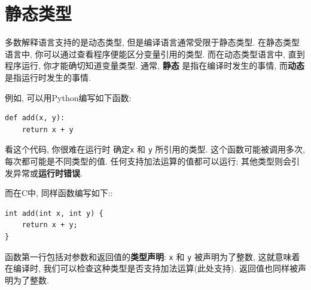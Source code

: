 \documentclass[12pt]{book}
\begin{document}
{%
\section{静态类型}
多数解释语言支持的是动态类型, 但是编译语言通常受限于静态类型.
在静态类型语言中, 你可以通过查看程序便能区分变量引用的类型.
而在动态类型语言中, 直到程序运行, 你才能确切知道变量类型.
通常, {\bf 静态} 是指在编译时发生的事情, 
而{\bf 动态} 是指运行时发生的事情.

例如, 可以用Python编写如下函数:

\begin{verbatim}
def add(x, y):
    return x + y
\end{verbatim}
看这个代码, 你很难在运行时%
确定{\tt x} 和 {\tt y} 所引用的类型.
这个函数可能被调用多次, 每次都可能是不同类型的值.
任何支持加法运算的值都可以运行; 
其他类型则会引发异常或{\bf 运行时错误}.

而在C中, 同样函数编写如下::

\begin{verbatim}
int add(int x, int y) {
    return x + y;
}
\end{verbatim}

函数第一行包括对参数和返回值的{\bf 类型声明}:
{\tt x} 和 {\tt y} 被声明为了整数, 
这就意味着在编译时, 我们可以检查这种类型是否支持加法运算(此处支持).
返回值也同样被声明为了整数.

}
\end{document}
